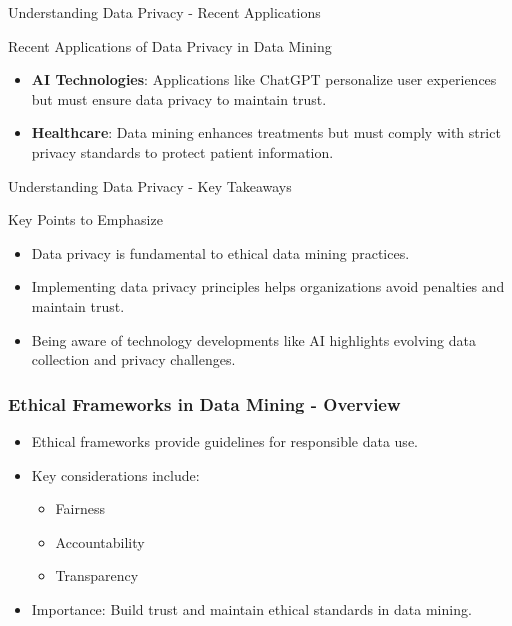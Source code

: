 \documentclass[aspectratio=169]{beamer}
\begin{document}
\begin{frame}[fragile]{Understanding Data Privacy - Recent Applications}
    \begin{block}{Recent Applications of Data Privacy in Data Mining}
        \begin{itemize}
            \item \textbf{AI Technologies}: Applications like ChatGPT personalize user experiences but must ensure data privacy to maintain trust.
            \item \textbf{Healthcare}: Data mining enhances treatments but must comply with strict privacy standards to protect patient information.
        \end{itemize}
    \end{block}
\end{frame}

\begin{frame}[fragile]{Understanding Data Privacy - Key Takeaways}
    \begin{block}{Key Points to Emphasize}
        \begin{itemize}
            \item Data privacy is fundamental to ethical data mining practices.
            \item Implementing data privacy principles helps organizations avoid penalties and maintain trust.
            \item Being aware of technology developments like AI highlights evolving data collection and privacy challenges.
        \end{itemize}
    \end{block}
\end{frame}

\begin{frame}[fragile]
    \frametitle{Ethical Frameworks in Data Mining - Overview}
    \begin{itemize}
        \item Ethical frameworks provide guidelines for responsible data use.
        \item Key considerations include:
        \begin{itemize}
            \item Fairness
            \item Accountability
            \item Transparency
        \end{itemize}
        \item Importance: Build trust and maintain ethical standards in data mining.
    \end{itemize}
\end{frame}
\end{document}

